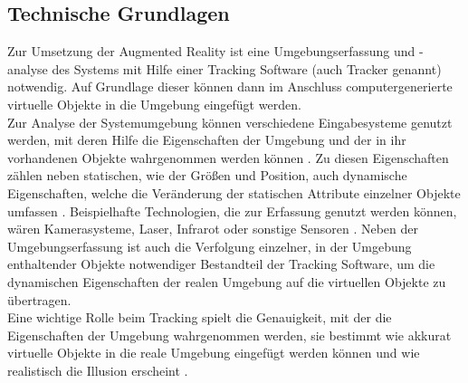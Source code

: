 \subsection{Technische Grundlagen}
Zur Umsetzung der Augmented Reality ist eine Umgebungserfassung und -analyse des Systems mit Hilfe einer Tracking Software (auch Tracker genannt) notwendig. Auf Grundlage dieser können dann im Anschluss computergenerierte virtuelle Objekte in die Umgebung eingefügt werden. \\
Zur Analyse der Systemumgebung können verschiedene Eingabesysteme genutzt werden, mit deren Hilfe die Eigenschaften der Umgebung und der in ihr vorhandenen Objekte wahrgenommen werden können \citep[S. 22]{tab:augmented-reality}. Zu diesen Eigenschaften zählen neben statischen, wie der Größen und Position, auch dynamische Eigenschaften, welche die Veränderung der statischen Attribute einzelner Objekte umfassen . Beispielhafte Technologien, die zur Erfassung genutzt werden können, wären Kamerasysteme, Laser, Infrarot oder sonstige Sensoren \citep[S. 22]{tab:augmented-reality}.
Neben der Umgebungserfassung ist auch die Verfolgung einzelner, in der Umgebung enthaltender Objekte notwendiger Bestandteil der Tracking Software, um die dynamischen Eigenschaften der realen Umgebung auf die virtuellen Objekte zu übertragen.\\
Eine wichtige Rolle beim Tracking spielt die Genauigkeit, mit der die Eigenschaften der Umgebung wahrgenommen werden, sie bestimmt wie akkurat virtuelle Objekte in die reale Umgebung eingefügt werden können und wie realistisch die Illusion erscheint \citep[S. 2]{klein:visual-tracking}.

